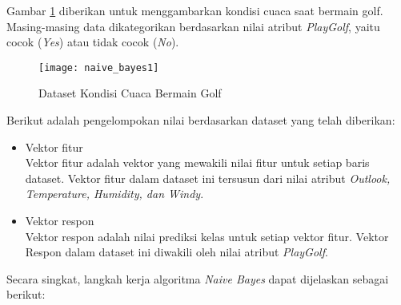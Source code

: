 \vspace{0.3cm}

\noindent Gambar \ref{fig:naive_bayes1} diberikan untuk menggambarkan kondisi cuaca saat bermain golf. Masing-masing data dikategorikan berdasarkan nilai atribut \textit{PlayGolf}, yaitu cocok (\textit{Yes}) atau tidak cocok (\textit{No}). 

\begin{figure}[H]
	\centering
	\texttt{[image: naive\_bayes1]}
	\caption{Dataset Kondisi Cuaca Bermain Golf}
	\label{fig:naive_bayes1}
\end{figure}

\noindent Berikut adalah pengelompokan nilai berdasarkan dataset yang telah diberikan:

\begin{itemize}

\item 
Vektor fitur\\
Vektor fitur adalah vektor yang mewakili nilai fitur untuk setiap baris dataset. Vektor fitur dalam dataset ini tersusun dari nilai atribut \textit{Outlook, Temperature, Humidity, dan Windy}.

\item
Vektor respon\\
Vektor respon adalah nilai prediksi kelas untuk setiap vektor fitur. Vektor Respon dalam dataset ini diwakili oleh nilai atribut \textit{PlayGolf}.

\end{itemize}
\vspace{0.5cm}
\noindent Secara singkat, langkah kerja algoritma \textit{Naive Bayes} dapat dijelaskan sebagai berikut:

